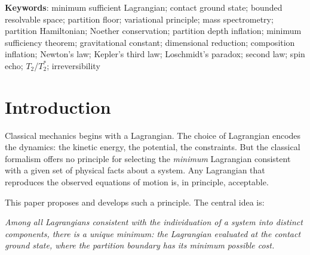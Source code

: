\documentclass[12pt, a4paper]{article}
\theoremstyle{plain}
\theoremstyle{definition}
\theoremstyle{remark}
\begin{document}
\begin{abstract}
We apply the framework to mass spectrometry, where the four standard analyser
equations --- time-of-flight (TOF), Orbitrap, Fourier-transform ion cyclotron
resonance (FT-ICR), and quadrupole --- are shown to be partition depth
inflations of a single contact-ground-state Lagrangian, related by CODATA
values with zero free parameters. The universal contact constant
$K = 588.016$~Cs-133 hyperfine cycles per Orbitrap cycle per $\sqrt{\mathrm{u}}$
is the coupling between the Cs-133 partition rate and the Orbitrap contact
potential, derivable from fundamental constants alone. The paper contains
no self-citations.

\end{abstract}

\vspace{1em}
\noindent\textbf{Keywords}: minimum sufficient Lagrangian; contact ground state;
bounded resolvable space; partition floor; variational principle; mass
spectrometry; partition Hamiltonian; Noether conservation; partition depth
inflation; minimum sufficiency theorem; gravitational constant; dimensional
reduction; composition inflation; Newton's law; Kepler's third law; Loschmidt's
paradox; second law; spin echo; $T_2$/$T_2^*$; irreversibility

\tableofcontents
\newpage

\section{Introduction}
\label{sec:introduction}

Classical mechanics begins with a Lagrangian. The choice of Lagrangian encodes
the dynamics: the kinetic energy, the potential, the constraints. But the
classical formalism offers no principle for selecting the \emph{minimum}
Lagrangian consistent with a given set of physical facts about a system. Any
Lagrangian that reproduces the observed equations of motion is, in principle,
acceptable.

This paper proposes and develops such a principle. The central idea is:

\begin{center}
\emph{Among all Lagrangians consistent with the individuation of a system into
distinct components, there is a unique minimum: the Lagrangian evaluated at the
contact ground state, where the partition boundary has its minimum possible
cost.}
\end{center}
\end{document}
